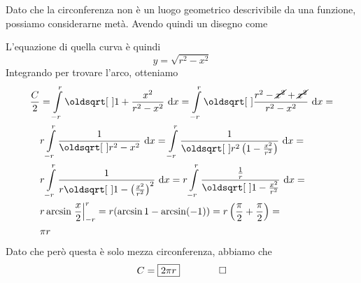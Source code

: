 Dato che la circonferenza non è un luogo geometrico descrivibile da una funzione, possiamo 
considerarne metà. Avendo quindi un disegno come
\begin{center}
\end{center}
L'equazione di quella curva è quindi
\begin{equation*}
  y = \sqrt{r^2-x^2}
\end{equation*}
Integrando per trovare l'arco, otteniamo
\begin{align*}
  \frac{C}{2} &= \int\limits_{-r}^{r} \sqrt{1+\frac{x^2}{r^2-x^2}} \,\dif x=
  \int\limits_{-r}^{r} \sqrt{\frac{r^2-\cancel{x^2}+\cancel{x^2}}{r^2-x^2}}\,\dif x=\\
  &r \int\limits_{-r}^{r} \frac{1}{\sqrt{r^2-x^2}}\,\dif x=
  \int\limits_{-r}^{r} \frac{1}{\sqrt{r^2 \left( 1-\frac{x^2}{r^2} \right)}}\,\dif x=\\
  & r \int\limits_{-r}^{r} \frac{1}{r \sqrt{1-\left( \frac{x^2}{r^2} \right)^2} }\,\dif x=
  r \int\limits_{-r}^{r} \frac{\frac{1}{r}}{\sqrt{1-\frac{x^2}{r^2}}}\,\dif x =\\
  & r\arcsin\left.\frac{x}{2}\right|_{-r}^r=r(\arcsin1-\arcsin(-1)) =
  r \left( \frac{\pi}{2}+\frac{\pi}{2} \right)=\\&\pi r
\end{align*}
Dato che però questa è solo mezza circonferenza, abbiamo che
\begin{equation*}
  C = \boxed{2\pi r} \qquad\qed
\end{equation*}
